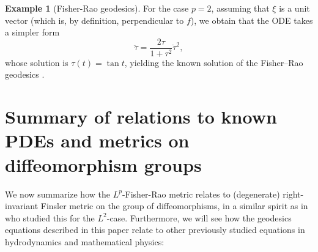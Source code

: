\documentclass[11pt]{amsart}
\theoremstyle{definition}
\newtheorem{example}[theorem]{Example}
\begin{document}
\begin{example}[Fisher-Rao geodesics]
For the case $p=2$, assuming that $\xi$ is a unit vector (which is, by definition, perpendicular to $f$), we obtain that the ODE takes a simpler form
\[
\ddot\tau = \frac{2\tau}{1+\tau^2}\dot\tau^2,
\]
whose solution is $\tau(t) = \tan t$, yielding the known solution of the Fisher--Rao geodesics \cite[Remark~4.4]{khesin2013geometry}. 
\end{example}

\section{Summary of relations to known PDEs and metrics on diffeomorphism groups}\label{sec:PDEs}
We now summarize how the $L^p$-Fisher-Rao metric relates to (degenerate) right-invariant Finsler metric on the group of diffeomorphisms, in a similar spirit as in~\cite{khesin2013geometry} who studied this for the $L^2$-case.
Furthermore, we will see how the geodesics equations described in this paper relate to other previously studied equations in hydrodynamics and mathematical physics:
\end{document}
